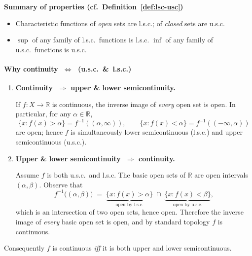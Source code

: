 \documentclass[12pt]{article}
\theoremstyle{definition} %
\theoremstyle{plain} %
\begin{document}
  \medskip
  \noindent\textbf{Summary of properties (cf.~Definition~\ref{def:lsc-usc})}
  \begin{itemize}
      \item Characteristic functions of \emph{open} sets are l.s.c.;  
            of \emph{closed} sets are u.s.c.
      \item $\sup$ of any family of l.s.c.\ functions is l.s.c.  
            $\inf$ of any family of u.s.c.\ functions is u.s.c.
  \end{itemize}
  \pagebreak
  \paragraph{Why continuity $\;\Longleftrightarrow\;$ (u.s.c.\ \&\ l.s.c.)}

\begin{enumerate}
\item \textbf{Continuity $\;\Longrightarrow$ upper \& lower semicontinuity.}

      If $f\colon X\to\mathbb{R}$ is continuous, the inverse image of
      \emph{every} open set is open.  
      In particular, for any $\alpha\in\mathbb{R}$,
      \[
          \{x:f(x)>\alpha\}=f^{-1}((\alpha,\infty)), 
          \qquad
          \{x:f(x)<\alpha\}=f^{-1}((-\infty,\alpha))
      \]
      are open; hence $f$ is simultaneously
      lower semicontinuous (l.s.c.) and upper semicontinuous (u.s.c.).

\item \textbf{Upper \& lower semicontinuity $\;\Longrightarrow$ continuity.}

      Assume $f$ is both u.s.c.\ and l.s.c.
      The basic open sets of $\mathbb{R}$ are open intervals $(\alpha,\beta)$.
      Observe that
      \[
          f^{-1}\bigl((\alpha,\beta)\bigr)
          \;=\;
          \underbrace{\{x:f(x)>\alpha\}}_{\text{open by l.s.c.}}
          \;\cap\;
          \underbrace{\{x:f(x)<\beta\}}_{\text{open by u.s.c.}},
      \]
      which is an intersection of two open sets, hence open.
      Therefore the inverse image of \emph{every} basic open set is open,
      and by standard topology $f$ is continuous.
\end{enumerate}

\noindent
Consequently \(f\) is continuous \emph{iff} it is both upper and lower
semicontinuous.
\pagebreak
\end{document}
